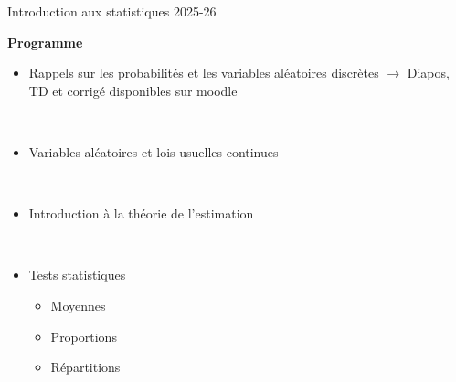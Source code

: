 \documentclass{beamer}
\begin{document}
\begin{frame}{Introduction aux statistiques 2025-26}{}

\begin{center}{\bf \Large Programme} \end{center}
\vspace{0.2cm}

\begin{itemize}
\item {\color{gray} Rappels sur les probabilités et les variables aléatoires discrètes $\rightarrow$ Diapos, TD et corrigé disponibles sur moodle}

\

\item Variables aléatoires et lois usuelles continues

\

\item Introduction à la théorie de l'estimation 

\

\item Tests statistiques
 \begin{itemize}
 \item Moyennes 
 \item Proportions 
 \item Répartitions
 \end{itemize}
\end{itemize}
\end{frame}
\end{document}
